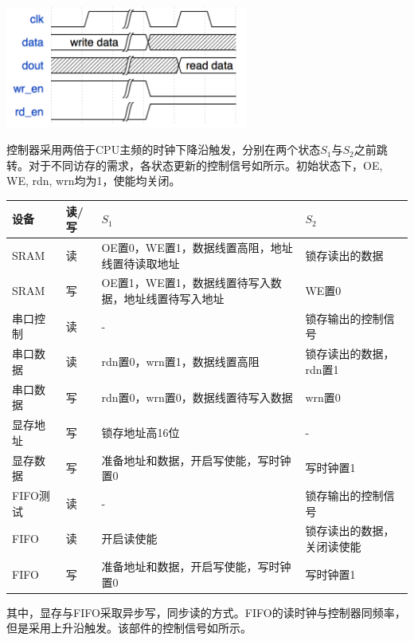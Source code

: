 \begin{center}
    \includegraphics[width=8cm]{image/device/fifo}
\end{center}

控制器采用两倍于CPU主频的时钟下降沿触发，分别在两个状态$S_1$与$S_2$之前跳转。对于不同访存的需求，各状态更新的控制信号如所示。初始状态下，OE, WE, rdn, wrn均为1，使能均关闭。

\begin{center}
    \label{table:mem_signals}
    \begin{longtable}{p{}p{}p{}p{}}
        \toprule
        设备 & 读/写 & $S_1$ & $S_2$ \\
        \midrule
        SRAM & 读 & OE置0，WE置1，数据线置高阻，地址线置待读取地址 & 锁存读出的数据 \\
        SRAM & 写 & OE置1，WE置1，数据线置待写入数据，地址线置待写入地址 & WE置0 \\
        串口控制 & 读 & - & 锁存输出的控制信号 \\
        串口数据 & 读 & rdn置0，wrn置1，数据线置高阻 & 锁存读出的数据，rdn置1 \\
        串口数据 & 写 & rdn置0，wrn置0，数据线置待写入数据 & wrn置0 \\
        显存地址 & 写 & 锁存地址高16位 & - \\
        显存数据 & 写 & 准备地址和数据，开启写使能，写时钟置0 & 写时钟置1 \\
        FIFO测试 & 读 & - & 锁存输出的控制信号 \\
        FIFO & 读 & 开启读使能 & 锁存读出的数据，关闭读使能 \\
        FIFO & 写 & 准备地址和数据，开启写使能，写时钟置0 & 写时钟置1 \\
        \bottomrule
    \end{longtable}
\end{center}

其中，显存与FIFO采取异步写，同步读的方式。FIFO的读时钟与控制器同频率，但是采用上升沿触发。该部件的控制信号如所示。

